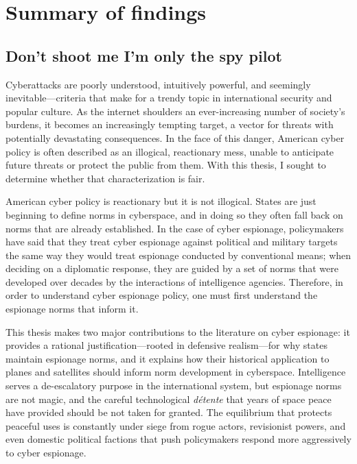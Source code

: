 \documentclass[11pt]{memoir}
\begin{document}
\section{Summary of findings}
\subsection{Don't shoot me I'm only the spy pilot}
Cyberattacks are poorly understood, intuitively powerful, and seemingly inevitable---criteria that make for a trendy topic in international security and popular culture. As the internet shoulders an ever-increasing number of society's burdens, it becomes an increasingly tempting target, a vector for threats with potentially devastating consequences. In the face of this danger, American cyber policy is often described as an illogical, reactionary mess, unable to anticipate future threats or protect the public from them. With this thesis, I sought to determine whether that characterization is fair.

American cyber policy is reactionary but it is not illogical. States are just beginning to define norms in cyberspace, and in doing so they often fall back on norms that are already established. In the case of cyber espionage, policymakers have said that they treat cyber espionage against political and military targets the same way they would treat espionage conducted by conventional means; when deciding on a diplomatic response, they are guided by a set of norms that were developed over decades by the interactions of intelligence agencies. Therefore, in order to understand cyber espionage policy, one must first understand the espionage norms that inform it.

This thesis makes two major contributions to the literature on cyber espionage: it provides a rational justification---rooted in defensive realism---for why states maintain espionage norms, and it explains how their historical application to planes and satellites should inform norm development in cyberspace. Intelligence serves a de-escalatory purpose in the international system, but espionage norms are not magic, and the careful technological \emph{d\'etente} that years of space peace have provided should be not taken for granted. The equilibrium that protects peaceful uses is constantly under siege from rogue actors, revisionist powers, and even domestic political factions that push policymakers respond more aggressively to cyber espionage.
\end{document}
